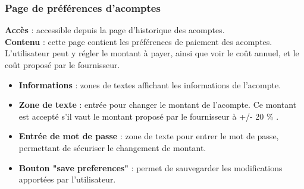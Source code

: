 \documentclass[../rapport.tex]{subfiles}
\begin{document}
\subsubsection{Page de préférences d'acomptes}
\noindent \textbf{Accès} : accessible depuis la page d'historique des acomptes. \\
\textbf{Contenu} : cette page contient les préférences de paiement des acomptes. L'utilisateur peut y régler le montant à payer, ainsi que voir le coût annuel, et le coût proposé par le fournisseur.
\begin{itemize}
    \item \textbf{Informations} : zones de textes affichant les informations de l'acompte.
    \item \textbf{Zone de texte} : entrée pour changer le montant de l'acompte. Ce montant est accepté s'il vaut le montant proposé par le fournisseur à +/- 20 \% .
    \item \textbf{Entrée de mot de passe} : zone de texte pour entrer le mot de passe, permettant de sécuriser le changement de montant.
    \item \textbf{Bouton "save preferences"} : permet de sauvegarder les modifications apportées par l'utilisateur.
\end{itemize}
\end{document}
